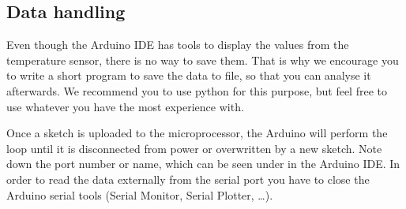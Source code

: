 \subsection{Data handling}\label{sec:data}
Even though the Arduino \ac{IDE} has tools to display the values from the temperature sensor, there is no way to save them. That is why we encourage you to write a short program to save the data to file, so that you can analyse it afterwards. We recommend you to use python for this purpose, but feel free to use whatever you have the most experience with.\par
%
Once a sketch is uploaded to the microprocessor, the Arduino will perform the loop until it is disconnected from power or overwritten by a new sketch. Note down the port number or name, which can be seen under  in the Arduino \ac{IDE}. In order to read the data externally from the serial port you have to close the Arduino serial tools (Serial Monitor, Serial Plotter, \ldots).\par
%
